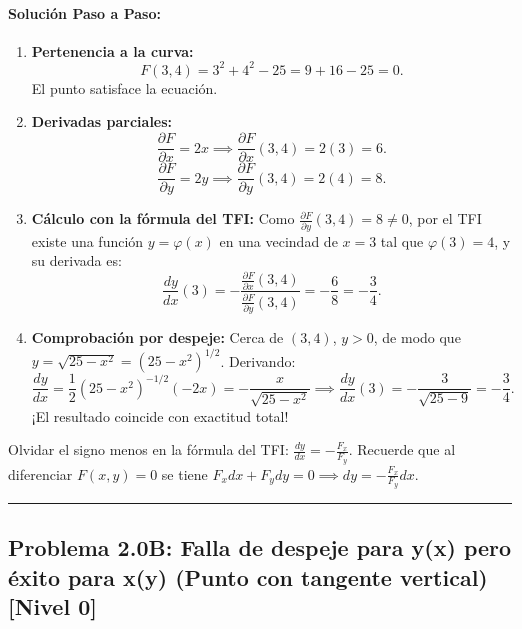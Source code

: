 \documentclass[11pt,a4paper]{article}
\begin{document}
\paragraph{Solución Paso a Paso:}\par
\begin{enumerate}[label=\textbf{\arabic*.}]
\item \textbf{Pertenencia a la curva:}
\[ F(3,4) = 3^2 + 4^2 - 25 = 9 + 16 - 25 = 0. \]
El punto satisface la ecuación.
\item \textbf{Derivadas parciales:}
\[ \frac{\partial F}{\partial x} = 2x \implies \frac{\partial F}{\partial x}(3,4) = 2(3) = 6. \]
\[ \frac{\partial F}{\partial y} = 2y \implies \frac{\partial F}{\partial y}(3,4) = 2(4) = 8. \]
\item \textbf{Cálculo con la fórmula del TFI:}
Como $\frac{\partial F}{\partial y}(3,4) = 8 \neq 0$, por el TFI existe una función $y = \varphi(x)$ en una vecindad de $x=3$ tal que $\varphi(3) = 4$, y su derivada es:
\[ \frac{dy}{dx}(3) = - \frac{\frac{\partial F}{\partial x}(3,4)}{\frac{\partial F}{\partial y}(3,4)} = -\frac{6}{8} = -\frac{3}{4}. \]
\item \textbf{Comprobación por despeje:}
Cerca de $(3,4)$, $y > 0$, de modo que $y = \sqrt{25 - x^2} = (25 - x^2)^{1/2}$. Derivando:
\[ \frac{dy}{dx} = \frac{1}{2}(25 - x^2)^{-1/2}(-2x) = -\frac{x}{\sqrt{25 - x^2}} \implies \frac{dy}{dx}(3) = -\frac{3}{\sqrt{25-9}} = -\frac{3}{4}. \]
¡El resultado coincide con exactitud total!
\end{enumerate}

\begin{trapbox}
Olvidar el signo menos en la fórmula del TFI: $\frac{dy}{dx} = -\frac{F_x}{F_y}$. Recuerde que al diferenciar $F(x,y)=0$ se tiene $F_x dx + F_y dy = 0 \implies dy = -\frac{F_x}{F_y} dx$.
\end{trapbox}

\vspace{0.5cm}
\hrule
\vspace{0.5cm}
\subsection*{Problema 2.0B: Falla de despeje para y(x) pero éxito para x(y) (Punto con tangente vertical) \hfill \color{teal}\small[Nivel 0]}
\end{document}
